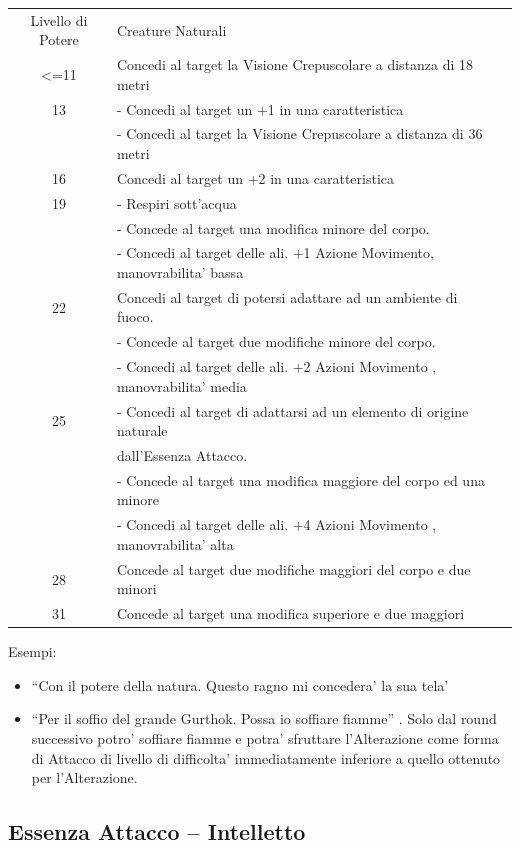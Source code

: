 \documentclass[a4paper,11pt,twoside,openany]{dndbook}
\begin{document}
\bigskip

\begin{tabular}{clc}
\toprule 
Livello di Potere & Creature Naturali\tabularnewline
<=11 & Concedi al target la Visione Crepuscolare a distanza di 18 metri \\
13 & - Concedi al target un +1 in una caratteristica\tabularnewline
& - Concedi al target la Visione Crepuscolare a distanza di 36 metri\tabularnewline
16 & Concedi al target un +2 in una caratteristica\tabularnewline
19 & - Respiri sott'acqua\tabularnewline
& - Concede al target una modifica minore del corpo.\tabularnewline
& - Concedi al target delle ali. +1 Azione Movimento, manovrabilita’ bassa\tabularnewline
22 & Concedi al target di potersi adattare ad un ambiente di fuoco.\tabularnewline
& - Concede al target due modifiche minore del corpo.\tabularnewline
& - Concedi al target delle ali. +2 Azioni Movimento , manovrabilita’ media\tabularnewline
25 & - Concedi al target di adattarsi ad un elemento di origine naturale\\
&dall’Essenza Attacco. \tabularnewline
& - Concede al target una modifica maggiore del corpo ed una minore\tabularnewline
& - Concedi al target delle ali. +4 Azioni Movimento , manovrabilita’ alta\tabularnewline
28 & Concede al target due modifiche maggiori del corpo e due minori\tabularnewline
31 & Concede al target una modifica superiore e due maggiori\tabularnewline
\bottomrule
\end{tabular}

\bigskip

Esempi:
\begin{itemize}
\item 
``Con il potere della natura. Questo ragno mi concedera' la sua tela' 
\item 
``Per il soffio del grande Gurthok. Possa io soffiare fiamme'' .
Solo dal round successivo potro' soffiare fiamme e potra' sfruttare
l'Alterazione come forma di Attacco di livello di difficolta' immediatamente
inferiore a quello ottenuto per l'Alterazione. 
\end{itemize}

\pagebreak 

\subsection{Essenza Attacco -- Intelletto}
\end{document}
